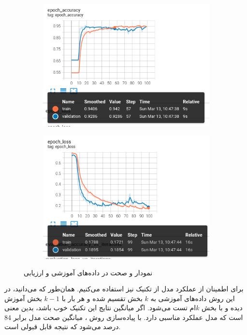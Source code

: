 \documentclass[12pt, a4paper]{article}
\begin{document}
\begin{figure}[h]
    \begin{subfigure}{0.45\linewidth}
        \centering
        \includegraphics[width=\linewidth]{images/q6_acc.png}
    \end{subfigure}
    \begin{subfigure}{0.45\linewidth}
        \centering
        \includegraphics[width=\linewidth]{images/q6_loss.png}
    \end{subfigure}
    \caption{نمودار  و صحت در داده‌های آموزشی و ارزیابی}
    \label{general_model_results}
\end{figure}

برای اطمینان از عملکرد مدل از تکنیک  نیز استفاده می‌کنیم.
همان‌طور که می‌دانید، در این روش داده‌های آموزشی به $k$ بخش تقسیم شده و هر بار با $k-1$ بخش آموزش دیده و با
بخش $k$ام تست می‌شود. اگر میانگین نتایج این تکنیک خوب باشد، بدین معنی است که مدل عملکرد مناسبی دارد.
با پیاده‌سازی روش ، میانگین صحت مدل برابر 84 درصد می‌شود که نتیجه قابل قبولی است.
\end{document}
